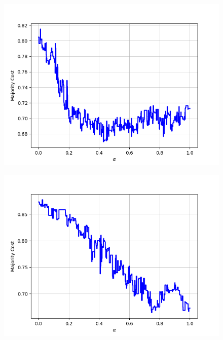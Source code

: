 \begin{figure}[h]
\begin{minipage}{.19\textwidth}
  {\includegraphics[width=\linewidth]{plots/omniglot-intra-ac/Futurama}}
\end{minipage}
\begin{minipage}{.19\textwidth}
  \centering
  {\includegraphics[width=\linewidth]{plots/omniglot-intra-ac/Grantha}}
\end{minipage}
\begin{minipage}{.19\textwidth}
  \centering

\end{minipage}
\end{figure}

